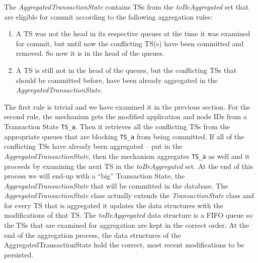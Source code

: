 The \emph{AggregatedTransactionState} contains TSs from the
\emph{toBeAggregated} set that are eligible for commit according to the
following aggregation rules:
\begin{enumerate}
  \item A TS was not the head in its respective queues at the time it
    was examined for commit, but until now the conflicting TS(s) have
    been committed and removed. So now it is in the head of the
    queues.

  \item A TS is still not in the head of the queues, but the
    conflicting TSs that should be committed before, have been already
    aggregated in the \emph{AggregatedTransactionState}.
\end{enumerate}

The first rule is trivial and we have examined it in the previous
section. For the second rule, the mechanism gets the modified
application and node IDs from a Transaction State \texttt{TS\_a}.
Then it retrieves all the conflicting TSs from the appropriate queues
that are blocking \texttt{TS\_a} from being committed. If all of the
conflicting TSs have already been aggregated -- put in the
\emph{AggregatedTransactionState}, then the mechanism aggregates
\texttt{TS\_a} as well and it proceeds by examining the next TS in the
\emph{toBeAggregated} set. At the end of this process we will end-up
with a ``big'' Transaction State, the
\emph{AggregatedTransactionState} that will be committed in the
database. The \emph{AggregatedTransactionState} class actually extends
the \emph{TransactionState} class and for every TS that is aggregated
it updates the data structures with the modifications of that TS. The
\emph{toBeAggregated} data structure is a FIFO queue so the TSs that
are examined for aggregation are kept in the correct order. At the
end of the aggregation process, the data structures of the
AggregatedTransactionState hold the correct, most recent modifications to be persisted.

